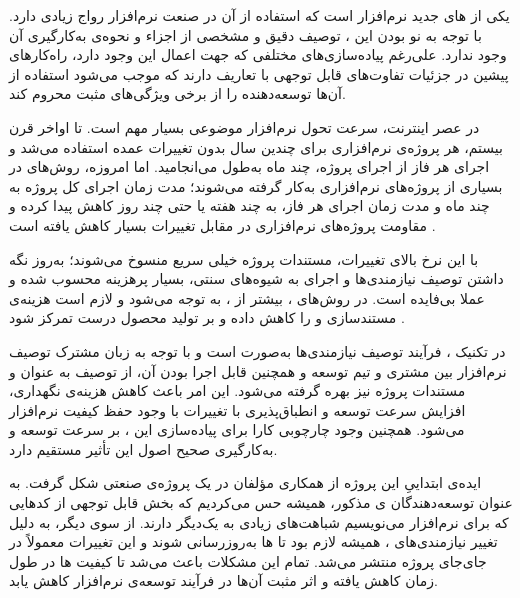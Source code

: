     یکی
از ‌های جدید  نرم‌افزار است که استفاده از آن در صنعت
نرم‌افزار رواج زیادی دارد. با توجه به نو بودن این ،
توصیف دقیق و مشخصی از اجزاء و نحوه‌ی به‌کارگیری آن وجود ندارد. علی‌رغم
پیاده‌سازی‌های مختلفی که جهت اعمال این  وجود دارد،
راه‌کارهای پیشین در جزئیات تفاوت‌های قابل توجهی با تعاریف
 دارند که موجب می‌شود استفاده از آن‌ها توسعه‌دهنده را از
برخی ویژگی‌های مثبت  محروم کند.

در عصر اینترنت، سرعت تحول نرم‌افزار موضوعی بسیار مهم است. تا اواخر قرن
بیستم، هر پروژه‌ی نرم‌افزاری برای چندین سال بدون تغییرات عمده استفاده
می‌شد و اجرای هر فاز از اجرای پروژه، چند ماه به‌طول می‌انجامید. اما
امروزه، روش‌های  در بسیاری از پروژه‌های نرم‌افزاری به‌کار
گرفته می‌شوند؛ مدت زمان اجرای کل پروژه به چند ماه و مدت زمان اجرای هر
فاز، به چند هفته یا حتی چند روز کاهش پیدا کرده و مقاومت پروژه‌های
نرم‌افزاری در مقابل تغییرات بسیار کاهش یافته است .

با این نرخ بالای تغییرات، مستندات پروژه خیلی سریع منسوخ می‌شوند؛ به‌روز
نگه داشتن توصیف نیازمندی‌ها و اجرای  به شیوه‌های سنتی، بسیار
پرهزینه محسوب شده و عملا بی‌فایده است. در روش‌های ،
بیشتر از ، به
 توجه می‌شود و لازم
است هزینه‌ی مستندسازی و  را کاهش داده و بر تولید محصول درست
تمرکز شود .

در تکنیک ، فرآیند توصیف نیازمندی‌ها به‌صورت
 است و با توجه به زبان مشترک توصیف نرم‌افزار بین مشتری و
تیم توسعه و همچنین قابل اجرا بودن آن، از توصیف به عنوان  و
مستندات پروژه نیز بهره گرفته می‌شود. این امر باعث کاهش هزینه‌ی نگهداری،
افزایش سرعت توسعه  و انطباق‌پذیری با تغییرات با وجود حفظ
کیفیت نرم‌افزار می‌شود. همچنین وجود چارچوبی کارا برای پیاده‌سازی این
، بر سرعت توسعه و به‌کارگیری صحیح اصول این 
تأثیر مستقیم دارد.

ایده‌ی ابتداییِ این پروژه از همکاری مؤلفان در یک پروژه‌ی صنعتی شکل گرفت. به عنوان توسعه‌دهندگان ‌ی مذکور، همیشه حس می‌کردیم که بخش قابل توجهی از کدهایی که برای  نرم‌افزار می‌نویسیم شباهت‌های زیادی به یک‌دیگر دارند.
از سوی دیگر، به دلیل تغییر نیازمندی‌های ، همیشه لازم بود تا ‌ها به‌روزرسانی شوند و این تغییرات معمولاً در جای‌جای پروژه منتشر می‌شد. تمام این مشکلات باعث می‌شد تا کیفیت ‌ها در طول زمان کاهش یافته و اثر مثبت آن‌ها در فرآیند توسعه‌ی نرم‌افزار کاهش یابد.

